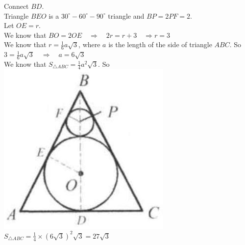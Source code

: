 \documentclass{article}
\begin{document}
Connect \(B D\).\\
Triangle \(B E O\) is a \(30^{\circ}-60^{\circ}-90^{\circ}\) triangle and \(B P=2 P F=2\).\\
Let \(O E=r\).\\
We know that \(B O=2 O E \quad \Rightarrow \quad 2 r=r+3 \quad \Rightarrow r=3\)\\
We know that \(r=\frac{1}{6} a \sqrt{3}\), where \(a\) is the length of the side of triangle \(A B C\). So \(3=\frac{1}{6} a \sqrt{3} \quad \Rightarrow \quad a=6 \sqrt{3}\)\\
We know that \(S_{\triangle A B C}=\frac{1}{4} a^{2} \sqrt{3}\). So\\
\centering
\includegraphics[width=\textwidth]{images/176(2).jpg}\\
\(S_{\triangle A B C}=\frac{1}{4} \times(6 \sqrt{3})^{2} \sqrt{3}=27 \sqrt{3}\)\\
\end{document}
